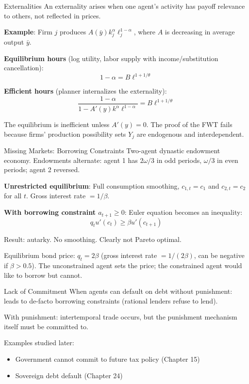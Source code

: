 \documentclass[blue]{beamer}
\begin{document}
\begin{frame}{Externalities}
	An externality arises when one agent's activity has payoff relevance to others, not reflected in prices.
	
	\textbf{Example}: Firm $j$ produces $A(\bar{y}) k_j^\alpha \ell_j^{1-\alpha}$, where $A$ is decreasing in average output $\bar{y}$.
	
	\textbf{Equilibrium hours} (log utility, labor supply with income/substitution cancellation):
	\[
	1 - \alpha = B \ell^{1+1/\theta}
	\]
	
	\textbf{Efficient hours} (planner internalizes the externality):
	\[
	\frac{1 - \alpha}{1 - A'(y) k^\alpha \ell^{1-\alpha}} = B \ell^{1+1/\theta}
	\]
	
	The equilibrium is inefficient unless $A'(y) = 0$. The proof of the FWT fails because firms' production possibility sets $Y_j$ are endogenous and interdependent.
\end{frame}

\begin{frame}{Missing Markets: Borrowing Constraints}
	Two-agent dynastic endowment economy. Endowments alternate: agent 1 has $2\omega/3$ in odd periods, $\omega/3$ in even periods; agent 2 reversed.
	

	\textbf{Unrestricted equilibrium}: Full consumption smoothing, $c_{1,t} = c_1$ and $c_{2,t} = c_2$ for all $t$. Gross interest rate $= 1/\beta$.
	

	\textbf{With borrowing constraint $a_{t+1} \geq 0$}: Euler equation becomes an inequality:
	\[
	q_t u'(c_t) \geq \beta u'(c_{t+1})
	\]
	
	Result: autarky. No smoothing. Clearly not Pareto optimal.
	
	\bigskip
	Equilibrium bond price: $q_t = 2\beta$ (gross interest rate $= 1/(2\beta)$, can be negative if $\beta > 0.5$). The unconstrained agent sets the price; the constrained agent would like to borrow but cannot.
\end{frame}

\begin{frame}{Lack of Commitment}
	When agents can default on debt without punishment: leads to de-facto borrowing constraints (rational lenders refuse to lend).
	
	\bigskip
	With punishment: intertemporal trade occurs, but the punishment mechanism itself must be committed to.
	
	\bigskip
	Examples studied later:
	\begin{itemize}
		\item Government cannot commit to future tax policy (Chapter 15)
		\item Sovereign debt default (Chapter 24)
	\end{itemize}
\end{frame}
\end{document}
